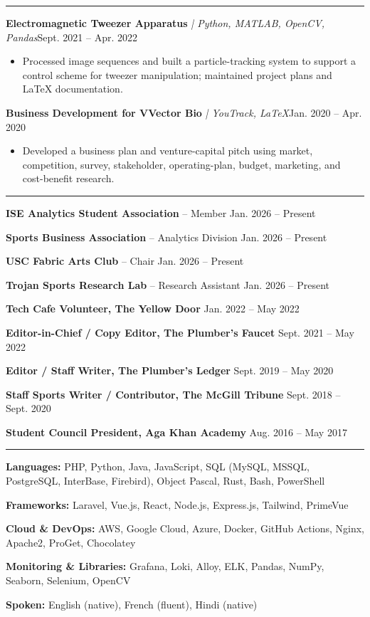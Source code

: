 \documentclass[10pt,letterpaper]{article}
\newcommand{\resumesection}[1]{\vspace{5pt}{\large\scshape #1}\par\hrule\vspace{3pt}}
\begin{document}
\resumesection{Selected Projects}
\textbf{Electromagnetic Tweezer Apparatus} \textit{| Python, MATLAB, OpenCV, Pandas}\hfill Sept. 2021 -- Apr. 2022
\begin{itemize}
\item Processed image sequences and built a particle-tracking system to support a control scheme for tweezer manipulation; maintained project plans and LaTeX documentation.
\end{itemize}
\textbf{Business Development for VVector Bio} \textit{| YouTrack, LaTeX}\hfill Jan. 2020 -- Apr. 2020
\begin{itemize}
\item Developed a business plan and venture-capital pitch using market, competition, survey, stakeholder, operating-plan, budget, marketing, and cost-benefit research.
\end{itemize}

\resumesection{Extra Curriculars}
\textbf{ISE Analytics Student Association} -- Member \hfill Jan. 2026 -- Present\par
\textbf{Sports Business Association} -- Analytics Division \hfill Jan. 2026 -- Present\par
\textbf{USC Fabric Arts Club} -- Chair \hfill Jan. 2026 -- Present\par
\textbf{Trojan Sports Research Lab} -- Research Assistant \hfill Jan. 2026 -- Present\par
\textbf{Tech Cafe Volunteer, The Yellow Door} \hfill Jan. 2022 -- May 2022\par
\textbf{Editor-in-Chief / Copy Editor, The Plumber's Faucet} \hfill Sept. 2021 -- May 2022\par
\textbf{Editor / Staff Writer, The Plumber's Ledger} \hfill Sept. 2019 -- May 2020\par
\textbf{Staff Sports Writer / Contributor, The McGill Tribune} \hfill Sept. 2018 -- Sept. 2020\par
\textbf{Student Council President, Aga Khan Academy} \hfill Aug. 2016 -- May 2017

\resumesection{Technical Skills}
\textbf{Languages:} PHP, Python, Java, JavaScript, SQL (MySQL, MSSQL, PostgreSQL, InterBase, Firebird), Object Pascal, Rust, Bash, PowerShell\par
\textbf{Frameworks:} Laravel, Vue.js, React, Node.js, Express.js, Tailwind, PrimeVue\par
\textbf{Cloud \& DevOps:} AWS, Google Cloud, Azure, Docker, GitHub Actions, Nginx, Apache2, ProGet, Chocolatey\par
\textbf{Monitoring \& Libraries:} Grafana, Loki, Alloy, ELK, Pandas, NumPy, Seaborn, Selenium, OpenCV\par
\textbf{Spoken:} English (native), French (fluent), Hindi (native)
\end{document}
